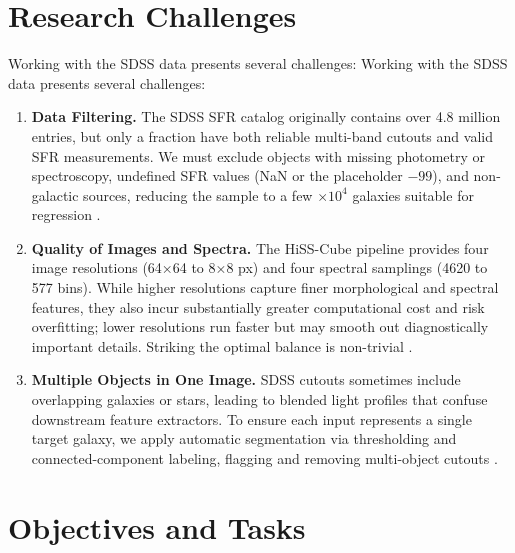 \documentclass[english,bachelor,oneside]{ctufit-thesis}
\begin{document}
\section{Research Challenges}

Working with the SDSS data presents several challenges:
Working with the SDSS data presents several challenges:
\begin{enumerate}
  \item \textbf{Data Filtering.} The SDSS SFR catalog originally contains over 4.8 million entries, but only a fraction have both reliable multi-band cutouts and valid SFR measurements. We must exclude objects with missing photometry or spectroscopy, undefined SFR values (NaN or the placeholder $-99$), and non-galactic sources, reducing the sample to a few $\times10^4$ galaxies suitable for regression \cite{SDSS_SFR_DOC}.
  \item \textbf{Quality of Images and Spectra.} The HiSS-Cube pipeline provides four image resolutions (64×64 to 8×8 px) and four spectral samplings (4620 to 577 bins). While higher resolutions capture finer morphological and spectral features, they also incur substantially greater computational cost and risk overfitting; lower resolutions run faster but may smooth out diagnostically important details. Striking the optimal balance is non-trivial \cite{nadvornik2021hiss}.
  \item \textbf{Multiple Objects in One Image.} SDSS cutouts sometimes include overlapping galaxies or stars, leading to blended light profiles that confuse downstream feature extractors. To ensure each input represents a single target galaxy, we apply automatic segmentation via thresholding and connected-component labeling, flagging and removing multi-object cutouts \cite{sezgin2004survey,GonzalezWoods2008}.
\end{enumerate}

\section{Objectives and Tasks}
\end{document}
